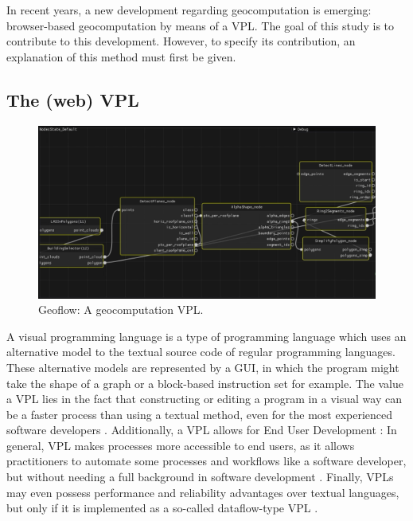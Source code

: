 In recent years, a new development regarding geocomputation is emerging:
browser-based geocomputation by means of a \ac{VPL}.
The goal of this study is to contribute to this development. 
However, to specify its contribution, an explanation of this method must first be given.

\subsection*{The (web) VPL}

\begin{figure}
  \centering
  \graphicspath{{../../assets/images/background/geo-vpl/}}
  \includegraphics[width=\linewidth]{geoflow.png}
  \caption{Geoflow: A geocomputation VPL. \citep{peters_geoflow_2019}}
  \label{fig:1:geoflow}
\end{figure}









A visual programming language is a type of programming language which uses an alternative model to the textual source code of regular programming languages. 
These alternative models are represented by a \ac{GUI}, in which the program might take the shape of a graph or a block-based instruction set for example. 
The value a VPL lies in the fact that constructing or editing a program in a visual way can be a faster process than using a textual method, even for the most experienced software developers \citep{green_usability_1996, kuhail_characterizing_2021}.
Additionally, a \ac{VPL} allows for End User Development \citep{kuhail_characterizing_2021}: 
In general, \ac{VPL} makes processes more accessible to end users, as it allows practitioners to automate some processes and workflows like a software developer, but without needing a full background in software development \citep{benac_recent_2022}. 
Finally, VPLs may even possess performance and reliability advantages over textual languages, but only if it is implemented as a so-called dataflow-type VPL \citep{sousa_dataflow_2012}. 


